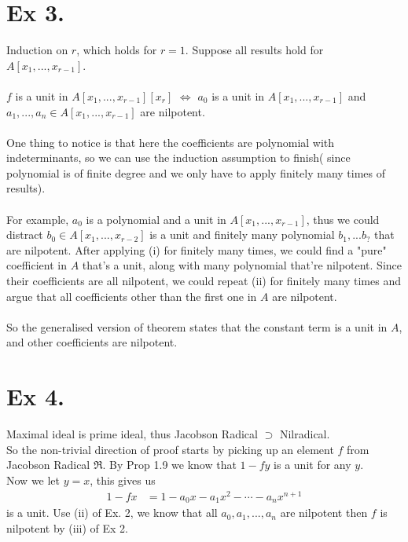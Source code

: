 \section{Ex 3.}\label{Atiyah Chapter 1 Ex 3.}
Induction on $r$, which holds for $r=1$. Suppose all results hold for $A[x_1,...,x_{r-1}]$.\\\\
$f$ is a unit in $A[x_1,...,x_{r-1}][x_r]$ $\Leftrightarrow$ $a_0$ is a unit in $A[x_1,...,x_{r-1}]$ and $a_1,...,a_n\in A[x_1,...,x_{r-1}]$ are nilpotent.\\\\
One thing to notice is that here the coefficients are polynomial with indeterminants, so we can use the induction assumption to finish( since polynomial is of finite degree and we only have to apply finitely many times of results).\\\\
For example, $a_0$ is a polynomial and a unit in $A[x_1,...,x_{r-1}]$, thus we could distract $b_0\in A[x_1,...,x_{r-2}]$ is a unit and finitely many polynomial $b_1,...b_{?}$ that are nilpotent.
After applying (i) for finitely many times, we could find a "pure" coefficient in $A$ that's a unit, along with many polynomial that're nilpotent. Since their coefficients are all nilpotent, we could repeat (ii) for finitely many times and argue that all coefficients other than the first one in $A$ are nilpotent.\\\\
So the generalised version of theorem states that the constant term is a unit in $A$, and other coefficients are nilpotent.



\section{Ex 4.}
Maximal ideal is prime ideal, thus Jacobson Radical $\supset $ Nilradical.\\
So the non-trivial direction of proof starts by picking up an element $f$ from Jacobson Radical $\mathfrak{R}$. 
By Prop 1.9 we know that $1-fy$ is a unit for any $y$.\\
Now we let $y=x$, this gives us
\begin{align*}
    1-fx&=1-a_0x-a_1x^2-\cdots-a_nx^{n+1}
\end{align*}is a unit. Use (ii) of Ex. 2, we know that all $a_0,a_1,...,a_n$ are nilpotent then $f$ is nilpotent by (iii) of Ex 2.



